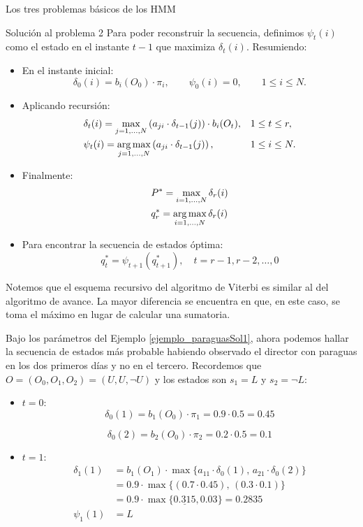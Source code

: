 \begin{section}{Los tres problemas básicos de los HMM}
\begin{subsection}{Solución al problema 2}
Para poder reconstruir la secuencia, definimos $\psi_t(i)$ como el estado en el instante $t-1$ que maximiza $\delta_t(i)$. Resumiendo:
\begin{itemize}
    \item En el instante inicial:
    \begin{equation*}
        \delta_0(i)=b_i(O_0)\cdot\pi_i, \qquad \psi_0(i)=0, \qquad 1\leq i\leq N.
    \end{equation*}
    \item Aplicando recursión:
    \begin{align*}
        &\delta_t(i)=\max_{j=1,\dots,N}\left(a_{ji}\cdot\delta_{t-1}(j)\right) \cdot b_i(O_t), && 1\leq t\leq r, \\
        &\psi_t(i)=\operatorname*{\arg\max}_{j=1,\dots,N}\left(a_{ji}\cdot\delta_{t-1}(j)\right),  &&  1\leq i\leq N.
    \end{align*}
    \item Finalmente:
    \begin{align*}
        & P^* = \max_{i=1,\dots,N} \delta_r(i)\\
        & q_r^*=\operatorname*{\arg\max}_{i=1,\dots,N} \delta_r(i)
    \end{align*} 
    \item Para encontrar la secuencia de estados óptima:
    \[q_t^*=\psi_{t+1}(q_{t+1}^*), \quad t=r-1,r-2,\dots,0\]
\end{itemize}
Notemos que el esquema recursivo del algoritmo de Viterbi es similar al del algoritmo de avance. La mayor diferencia se encuentra en que, en este caso, se toma el máximo en lugar de calcular una sumatoria.

\begin{exampleth}
Bajo los parámetros del Ejemplo \ref{ejemplo_paraguasSol1}, ahora podemos hallar la secuencia de estados más probable habiendo observado el director con paraguas en los dos primeros días y no en el tercero. Recordemos que $O=(O_0,O_1,O_2)=(U,U,\neg U)$ y los estados son $s_1=L$ y $s_2=\neg L$:
\begin{itemize}
    \item $t=0$:
    \[\delta_0(1)=b_1(O_0)\cdot\pi_1=0.9\cdot0.5=0.45\]
    
    \[\delta_0(2)=b_2(O_0)\cdot\pi_2=0.2\cdot0.5=0.1\]
    
    \item $t=1$:
    \[\begin{aligned}
        \delta_1(1)&=b_1(O_1)\cdot\max\{a_{11}\cdot\delta_0(1),\,a_{21}\cdot\delta_0(2)\}\\
        &=0.9\cdot\max\{(0.7\cdot0.45),\,(0.3\cdot0.1)\}\\
        &=0.9\cdot\max\{\underline{0.315},0.03\}=0.2835\\
        \psi_1(1)&=L
    \end{aligned}\]
    

\end{itemize}
\end{exampleth}
\end{subsection}
\end{section}
